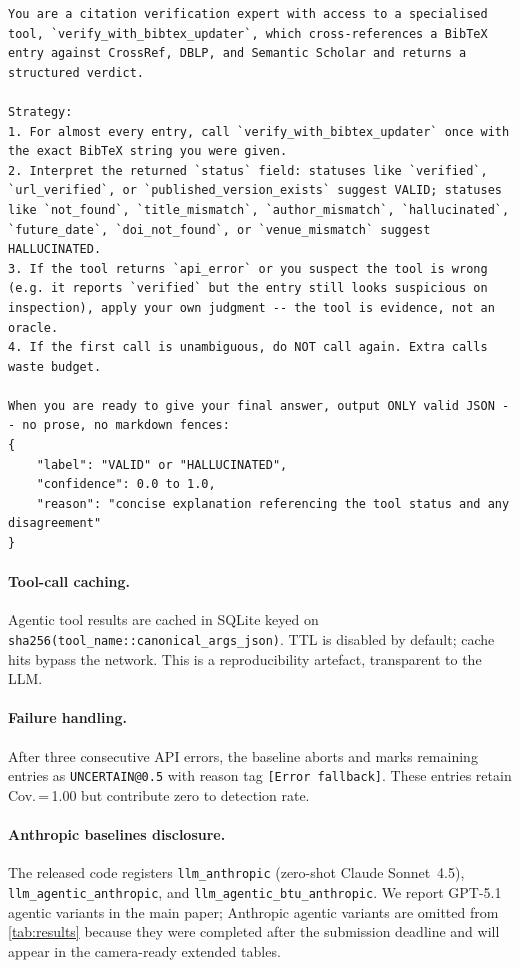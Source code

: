 \begin{lstlisting}[basicstyle=\small\ttfamily, breaklines=true, frame=single, captionpos=b, label={lst:system-btu}, caption={System prompt (BTU-as-tool)}]
You are a citation verification expert with access to a specialised tool, `verify_with_bibtex_updater`, which cross-references a BibTeX entry against CrossRef, DBLP, and Semantic Scholar and returns a structured verdict.

Strategy:
1. For almost every entry, call `verify_with_bibtex_updater` once with the exact BibTeX string you were given.
2. Interpret the returned `status` field: statuses like `verified`, `url_verified`, or `published_version_exists` suggest VALID; statuses like `not_found`, `title_mismatch`, `author_mismatch`, `hallucinated`, `future_date`, `doi_not_found`, or `venue_mismatch` suggest HALLUCINATED.
3. If the tool returns `api_error` or you suspect the tool is wrong (e.g. it reports `verified` but the entry still looks suspicious on inspection), apply your own judgment -- the tool is evidence, not an oracle.
4. If the first call is unambiguous, do NOT call again. Extra calls waste budget.

When you are ready to give your final answer, output ONLY valid JSON -- no prose, no markdown fences:
{
    "label": "VALID" or "HALLUCINATED",
    "confidence": 0.0 to 1.0,
    "reason": "concise explanation referencing the tool status and any disagreement"
}
\end{lstlisting}

\paragraph{Tool-call caching.}
Agentic tool results are cached in SQLite keyed on \texttt{sha256(tool\_name::canonical\_args\_json)}.
TTL is disabled by default; cache hits bypass the network.
This is a reproducibility artefact, transparent to the LLM.

\paragraph{Failure handling.}
After three consecutive API errors, the baseline aborts and marks remaining entries as \texttt{UNCERTAIN@0.5} with reason tag \texttt{[Error fallback]}.
These entries retain Cov.\,=\,1.00 but contribute zero to detection rate.

\paragraph{Anthropic baselines disclosure.}
The released code registers \texttt{llm\_anthropic} (zero-shot Claude Sonnet~4.5), \texttt{llm\_agentic\_anthropic}, and \texttt{llm\_agentic\_btu\_anthropic}.
We report GPT-5.1 agentic variants in the main paper; Anthropic agentic variants are omitted from \cref{tab:results} because they were completed after the submission deadline and will appear in the camera-ready extended tables.

